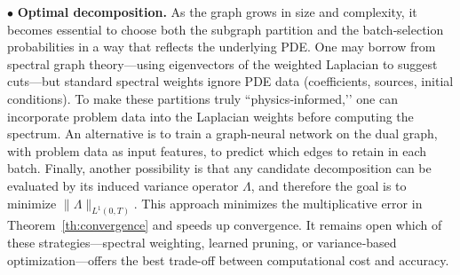 \documentclass[a4paper, 10pt, english]{article}
\def\to{\rightarrow}
\begin{document}




\noindent 
$\bullet$ \textbf{Optimal decomposition.}  
As the graph grows in size and complexity, it becomes essential to choose both the subgraph partition and the batch‐selection probabilities in a way that reflects the underlying PDE.  One may borrow from spectral graph theory—using eigenvectors of the weighted Laplacian to suggest cuts—but standard spectral weights ignore PDE data (coefficients, sources, initial conditions).  To make these partitions truly “physics‐informed,’’ one can incorporate problem data into the Laplacian weights before computing the spectrum.  An alternative is to train a graph-neural network on the dual graph, with problem data as input features, to predict which edges to retain in each batch.  Finally, another possibility is that any candidate decomposition can be evaluated by its induced variance operator $\Lambda$, and therefore the goal is to minimize $\|\Lambda\|_{L^1(0,T)}$. This approach minimizes the multiplicative error in Theorem~\ref{th:convergence} and speeds up convergence.  It remains open which of these strategies—spectral weighting, learned pruning, or variance‐based optimization—offers the best trade-off between computational cost and accuracy. 
\end{document}
